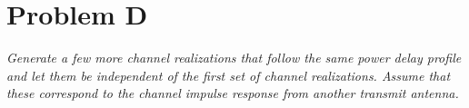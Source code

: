 \section{Problem D}
\textit{Generate a few more channel realizations that follow the same power delay profile and let them be independent of the first set of channel realizations. Assume that these correspond to the channel impulse response from another transmit antenna.}